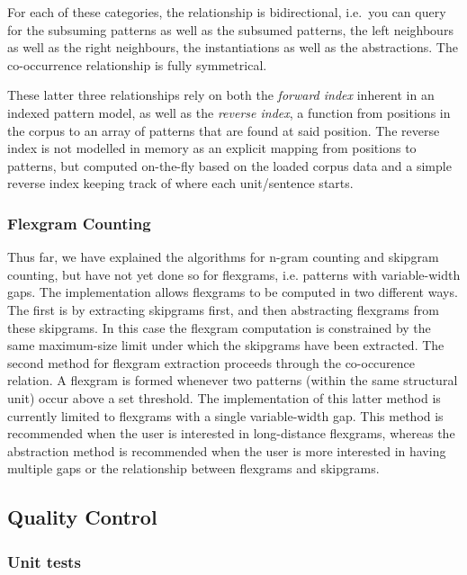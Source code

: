 \documentclass[a4paper,12pt]{article}
\begin{document}
For each of these categories, the relationship is bidirectional, i.e.\ you can
query for the subsuming patterns as well as the subsumed patterns, the left
neighbours as well as the right neighbours, the instantiations as well as the
abstractions. The co-occurrence relationship is fully symmetrical. 

These latter three relationships rely on both the \emph{forward index} inherent
in an indexed pattern model, as well as the \emph{reverse index}, a function
from positions in the corpus to an array of patterns that are found at said
position. The reverse index is not modelled in memory as an explicit mapping from
positions to patterns, but computed on-the-fly based on the loaded corpus data
and a simple reverse index keeping track of where each unit/sentence starts.

\subsubsection{Flexgram Counting}

Thus far, we have explained the algorithms for n-gram counting and skipgram
counting, but have not yet done so for flexgrams, i.e. patterns with
variable-width gaps. The implementation allows flexgrams to be computed in two
different ways. The first is by extracting skipgrams first, and then
abstracting flexgrams from these skipgrams. In this case the flexgram
computation is constrained by the same maximum-size limit under which the
skipgrams have been extracted.  The second method for flexgram extraction
proceeds through the co-occurence relation. A flexgram is formed whenever two
patterns (within the same structural unit) occur above a set threshold. The
implementation of this latter method is currently limited to flexgrams with a
single variable-width gap. This method is recommended when the user is
interested in long-distance flexgrams, whereas the abstraction method is
recommended when the user is more interested in having multiple gaps or
the relationship between flexgrams and skipgrams.

\subsection{Quality Control}
\label{sec:qc}


\subsubsection{Unit tests}
\end{document}

